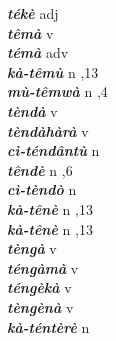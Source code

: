 \begin{multicols}{2}
{{\bfseries\itshape tékè}} \relax  adj  \relax   \relax  {} \relax   \relax  \\
{{\bfseries\itshape têmà}} \relax  v  \relax   \relax  {} \relax   \relax  \\
{{\bfseries\itshape témà}} \relax  adv  \relax   \relax  {} \relax   \relax  \\
{{\bfseries\itshape kà-têmù}} \relax  n  ,13  \relax   \relax  \\
{{\bfseries\itshape mù-têmwà}} \relax  n  ,4  \relax   \relax  \\
{{\bfseries\itshape tèndà}} \relax  v  \relax   \relax  {} \relax   \relax  \\
{{\bfseries\itshape tèndàhàrà}} \relax  v  \relax   \relax  {} \relax   \relax  \\
{{\bfseries\itshape cì-téndântù}} \relax  n   \relax  {} \relax   \relax  \\
{{\bfseries\itshape têndè}} \relax  n  ,6  \relax   \relax  \\
{{\bfseries\itshape cì-tèndò}} \relax  n   \relax  {} \relax   \relax  \\
{{\bfseries\itshape kà-tênè}} \relax  n  ,13  \relax   \relax  \\
{{\bfseries\itshape kà-tênè}} \relax  n  ,13  \relax   \relax  \\
{{\bfseries\itshape tèngà}} \relax  v  \relax   \relax  {} \relax   \relax  \\
{{\bfseries\itshape téngàmà}} \relax  v  \relax   \relax  {} \relax   \relax  \\
{{\bfseries\itshape téngèkà}} \relax  v  \relax   \relax  {} \relax   \relax  \\
{{\bfseries\itshape tèngènà}} \relax  v  \relax   \relax  {} \relax   \relax  \\
{{\bfseries\itshape kà-téntèrè}} \relax  n   \relax  {} \relax   \relax  \\

\end{multicols}
